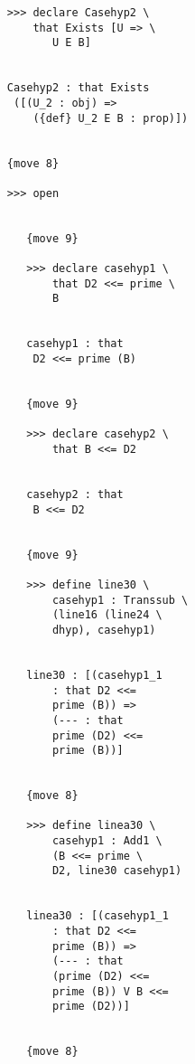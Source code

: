 \documentclass[12pt]{article}
\begin{document}
\begin{verbatim}
                        >>> declare Casehyp2 \
                            that Exists [U => \
                               U E B]


                        Casehyp2 : that Exists 
                         ([(U_2 : obj) => 
                            ({def} U_2 E B : prop)])


                        {move 8}

                        >>> open


                           {move 9}

                           >>> declare casehyp1 \
                               that D2 <<= prime \
                               B


                           casehyp1 : that 
                            D2 <<= prime (B)


                           {move 9}

                           >>> declare casehyp2 \
                               that B <<= D2


                           casehyp2 : that 
                            B <<= D2


                           {move 9}

                           >>> define line30 \
                               casehyp1 : Transsub \
                               (line16 (line24 \
                               dhyp), casehyp1)


                           line30 : [(casehyp1_1 
                               : that D2 <<= 
                               prime (B)) => 
                               (--- : that 
                               prime (D2) <<= 
                               prime (B))]


                           {move 8}

                           >>> define linea30 \
                               casehyp1 : Add1 \
                               (B <<= prime \
                               D2, line30 casehyp1)


                           linea30 : [(casehyp1_1 
                               : that D2 <<= 
                               prime (B)) => 
                               (--- : that 
                               (prime (D2) <<= 
                               prime (B)) V B <<= 
                               prime (D2))]


                           {move 8}


\end{verbatim}
\end{document}
